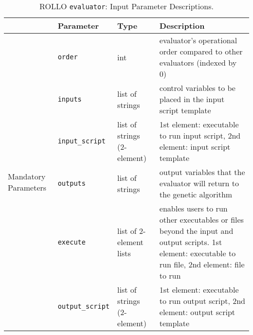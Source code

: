 \begin{table}[htbp]
    \centering
    \onehalfspacing
    \caption{\acrfull{ROLLO} \texttt{evaluator}: Input Parameter Descriptions.}
	\label{tab:evaluator-inputs}
    \footnotesize
    \begin{tabular}{l|lp{2.5cm}p{7cm}}
    \hline
    & \textbf{Parameter} & \textbf{Type} & \textbf{Description} \\
    \hline
    \multirow{9}{2cm}{Mandatory Parameters} & \texttt{order} & int 
    & evaluator's operational order compared to other evaluators (indexed by 0) \\
    \cline{2-4}
    & \texttt{inputs} & list of strings & control variables to be placed in the input 
    script template \\
    \cline{2-4}
    & \texttt{input\_script} & list of strings (2-element) & 1st element: executable to 
    run input script, 2nd element: input script template \\
    \cline{2-4}
    & \texttt{outputs} & list of strings & output variables that the evaluator will return to the genetic algorithm \\
    \hline
    \multirow{4}{2cm}{Optional Parameters} & \texttt{execute} & list of 2-element lists &
    enables users to run other executables or files beyond the input and output scripts. 
    1st element: executable to run file, 2nd element: file to run \\
    \cline{2-4}
    & \texttt{output\_script} & list of strings (2-element) & 1st element: executable to 
    run output script, 2nd element: output script template \\
    \hline 
    \end{tabular}
    \end{table}

